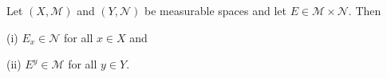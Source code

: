 Let $(X, \mathcal{M})$ and $(Y, \mathcal{N})$ be measurable spaces and let $E \in \mathcal{M} \times \mathcal{N}$. Then

(i) $E_x \in \mathcal{N}$ for all $x \in X$
and

(ii) $E^y \in \mathcal{M}$ for all $y \in Y$.